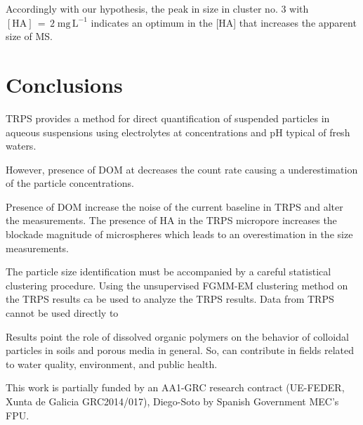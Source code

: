 \documentclass[journal=langd5,manuscript=article]{achemso}
\begin{document}
Accordingly with our hypothesis, the peak in size in cluster no. 3 with 
$\mathrm{[HA] \,=\, 2\;mg\,L^{-1}}$
indicates an optimum in the [HA] that increases the apparent size of MS.


\section{Conclusions}


TRPS provides a method for direct quantification of suspended particles in aqueous suspensions using electrolytes at concentrations and pH typical of fresh waters.

However, presence of DOM at  decreases the count rate causing a underestimation of the particle concentrations.

Presence of DOM increase the noise of the current baseline in TRPS and alter the measurements.
The presence of HA in the TRPS micropore increases the blockade magnitude of microspheres which leads to an overestimation in the size measurements.

The particle size identification  must be accompanied by a careful statistical clustering procedure. Using the unsupervised FGMM-EM clustering method on the TRPS results ca be used to analyze the TRPS results.
%
Data from  TRPS cannot be used directly to 


Results  point the role of dissolved organic polymers on the behavior of colloidal particles in soils and porous media in general. So, can contribute in fields related to 
water quality, environment, and public health.



\begin{acknowledgement}

This
work is partially funded by an AA1-GRC research contract (UE-FEDER,
Xunta de Galicia GRC2014/017), Diego-Soto by Spanish Government MEC’s FPU.

\end{acknowledgement}
\end{document}
